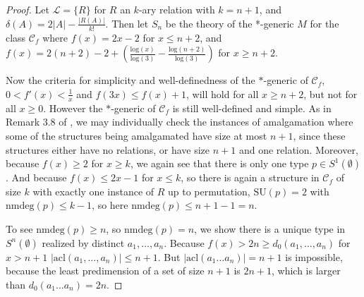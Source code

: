 \documentclass[11pt]{amsart}
\def\nmdeg{\mathop{\rm nmdeg}}
\newcommand{\sidebar}[1]{\vskip10pt\noindent
 \hskip.70truein\vrule width2.0pt\hskip.5em
 \vbox{\hsize= 4truein\noindent\footnotesize\relax #1 }\vskip10pt\noindent}
\def\nmdeg{\operatorname{nmdeg}}
\theoremstyle{definition}
\theoremstyle{remark}
\def\Notind{\setbox0=\hbox{$x$}\kern\wd0\hbox to 0pt{\mathchardef \nn=12854\hss$\nn$\kern1.4\wd0\hss}\hbox to 0pt{\hss$\mid$\hss}\lower.9\ht0 \hbox to 0pt{\hss$\smile$\hss}\kern\wd0}
\def\nind{\mathop{\mathpalette\Notind{}}}
\numberwithin{equation}{section}
\begin{document}
\begin{proof} 
Let $\mathcal{L} = \{R\}$ for $R$ an
$k$-ary relation with $k = n+1$, and $\delta(A) = 2|A| - \frac{|R(A)|}{k!}$. Then let $S_n$ be the theory of the *-generic $M$ for the class $\mathcal{C}_f$ where $f(x) = 2x -2$ for $x \leq
n+2$, and $f(x) = 2(n+2) -2 + (\frac{\mathrm{log}(x)}{\mathrm{log}(3)}-
\frac{\mathrm{log}(n+2)}{\mathrm{log}(3)})$ for $x \geq n + 2$.


Now the criteria for simplicity and well-definedness of the $*$-generic of $\mathcal{C}_f$, $0 < f'(x) < \frac{1}{x}$ and $f(3x)
\leq f(x) + 1$, will hold for all $x \geq n+2$, but not for all $x \geq 0$.
However the $*$-generic of $\mathcal{C}_f$ is still well-defined and simple. As in Remark 3.8 of \cite{Ev02}, we may
individually check the instances of amalgamation where some of the structures
being amalgamated have size at most $n+1$, since these structures either have
no relations, or have size $n+1$ and one relation. Moreover, because $f(x) \geq 2$ for $x \geq k$, we again
see that there is only one type $p \in S^{1}(\emptyset)$. And because $f(x) \leq 2x -1$ for $x \leq k$, so there is again a structure in $\mathcal{C}_{f}$ of size $k$ with exactly one instance of $R$ up to permutation, $\mathrm{SU}(p) = 2$ with
$\mathrm{nmdeg}(p) \leq k-1$, so here $\mathrm{nmdeg}(p) \leq n+1-1 = n$.

To see  $\mathrm{nmdeg}(p) \geq n$, so $\mathrm{nmdeg}(p) = n$, we show there
is   a unique type in $S^{n}(\emptyset)$ realized by distinct $a_{1}, \ldots,
a_{n}$.
Because $f(x) > 2n \geq d_{0}(a_{1}, \ldots,
a_{n})$ for $x >n + 1$
$|\mathrm{acl}(a_{1}, \ldots, a_{n})| \leq n+1$. But $|\mathrm{acl}(a_{1} \ldots a_{n})| = n+1$ is
impossible, because the least predimension of a set of size $n+1$ is $2n+1$, which is larger than $d_{0}(a_{1} \ldots a_{n}) = 2n$.









\end{proof}
\end{document}
